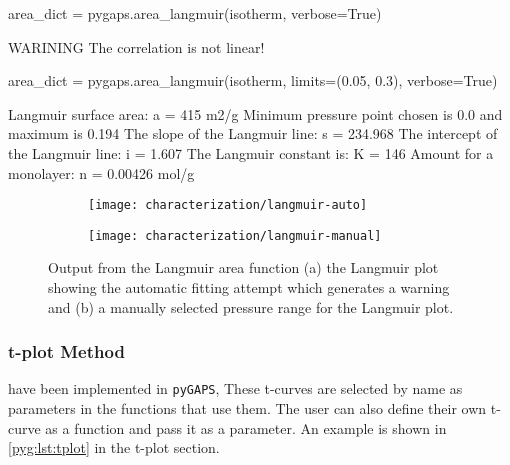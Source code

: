 \begin{samepage}
	\begin{python}[caption={Calculating a Langmuir area},label={pyg:lst:langmuirarea}]
area_dict = pygaps.area_langmuir(isotherm, verbose=True)
\end{python}
	\begin{pythonout}
WARINING The correlation is not linear!
\end{pythonout}
	\begin{python}
area_dict = pygaps.area_langmuir(isotherm, 
                                 limits=(0.05, 0.3), 
                                 verbose=True)
\end{python}
	\begin{pythonout}
Langmuir surface area: 	a = 415 m2/g
Minimum pressure point chosen is 0.0 and maximum is 0.194
The slope of the Langmuir line: 		s = 234.968
The intercept of the Langmuir line: 	i = 1.607
The Langmuir constant is:				K = 146
Amount for a monolayer: 				n = 0.00426 mol/g
\end{pythonout}
\end{samepage}

\begin{figure}[!htb]
	\centering

	\begin{subfigure}{0.45\linewidth}
		\parbox[c]{0.1\linewidth}{\caption{}%
			\label{pyg:fgr:langmuirarea-auto}}
		\parbox[b]{0.85\linewidth}{%
			\texttt{[image: characterization/langmuir-auto]}}
	\end{subfigure}%
	\begin{subfigure}{0.45\linewidth}
		\parbox[c]{0.1\linewidth}{\caption{}%
			\label{pyg:fgr:langmuirarea-manual}}
		\parbox[b]{0.85\linewidth}{%
			\texttt{[image: characterization/langmuir-manual]}}
	\end{subfigure}%

	\caption{Output from the Langmuir area function (a) the Langmuir plot
		showing the automatic fitting attempt which generates a warning and (b) a manually
		selected pressure range for the Langmuir plot.}%
	\label{pyg:fgr:langmuirarea}

\end{figure}


\subsubsection{t-plot Method}

have been implemented in \texttt{pyGAPS},
These t-curves are selected by name as parameters in
the functions that use them. The user can also define their
own t-curve as a function and pass it as a parameter. An example
is shown in \autoref{pyg:lst:tplot} in the t-plot section.


